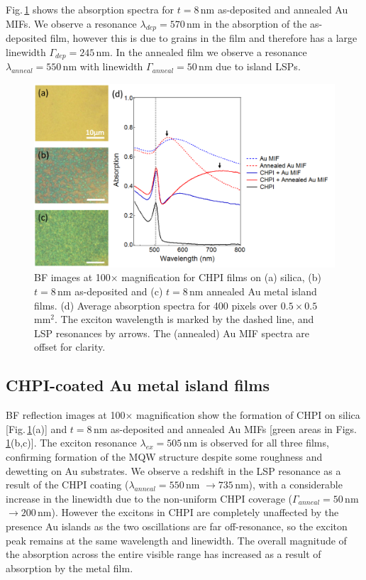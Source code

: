 Fig.\,\ref{6Fig3} shows the absorption spectra for $t=8$\,nm as-deposited and annealed Au MIFs. We observe a resonance $\lambda_{dep} = 570$\,nm in the absorption of the as-deposited film, however this is due to grains in the film and therefore has a large linewidth $\Gamma_{dep} = 245$\,nm. In the annealed film we observe a resonance $\lambda_{anneal} = 550$\,nm with linewidth $\Gamma_{anneal} = 50$\,nm due to island LSPs.

\begin{figure}[h!] 
\centering    
\includegraphics[width=\textwidth]{Fig3}
\caption{BF images at 100$\times$ magnification for CHPI films on (a) silica, (b) $t=8$\,nm as-deposited and (c) $t=8$\,nm annealed Au metal island films. (d) Average absorption spectra for 400 pixels over $0.5\times0.5$\,mm$^2$. The exciton wavelength is marked by the dashed line, and LSP resonances by arrows. The (annealed) Au MIF spectra are offset for clarity.}
\label{6Fig3}
\end{figure}
\subsection{CHPI-coated Au metal island films}

BF reflection images at 100$\times$ magnification show the formation of CHPI on silica [Fig.\,\ref{6Fig3}(a)] and $t=8$\,nm as-deposited and annealed Au MIFs [green areas in Figs.\,\ref{6Fig3}(b,c)]. The exciton resonance $\lambda_{ex} = 505$\,nm is observed for all three films, confirming formation of the MQW structure despite some roughness and dewetting on Au substrates. We observe a redshift in the LSP resonance as a result of the CHPI coating ($\lambda_{anneal} = 550$\,nm $\rightarrow 735$\,nm), with a considerable increase in the linewidth due to the non-uniform CHPI coverage ($\Gamma_{anneal} = 50$\,nm $\rightarrow 200$\,nm). However the excitons in CHPI are completely unaffected by the presence Au islands as the two oscillations are far off-resonance, so the exciton peak remains at the same wavelength and linewidth. The overall magnitude of the absorption across the entire visible range has increased as a result of absorption by the metal film.

